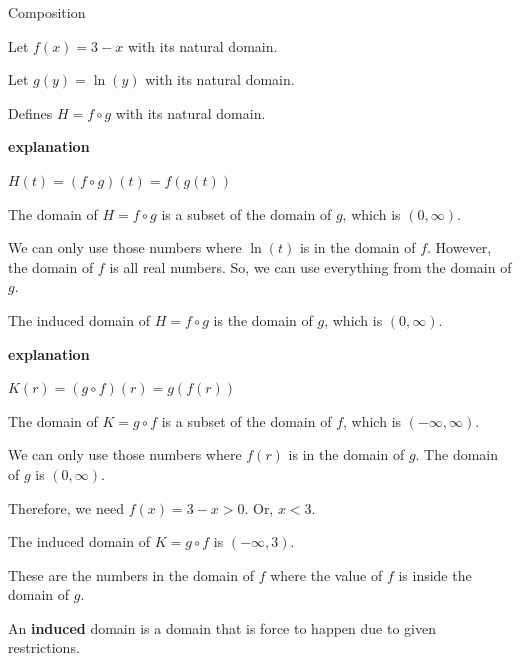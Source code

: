 \documentclass{ximera}
\begin{document}
\begin{example} Composition


Let $f(x) = 3 - x$ with its natural domain.


Let $g(y) = \ln(y)$ with its natural domain.


Defines $H = f \circ g$ with its natural domain.


\textbf{\textcolor{red!75!green}{explanation}} 


$H(t) = (f \circ g)(t) = f(g(t))$


The domain of $H = f \circ g$ is a subset of the domain of $g$, which is $(0, \infty)$.  

We can only use those numbers where $\ln(t)$ is in the domain of $f$.  However, the domain of $f$ is all real numbers.  So, we can use everything from the domain of $g$.

The induced domain of $H = f \circ g$ is the domain of $g$, which is $(0, \infty)$. 











\textbf{\textcolor{red!75!green}{explanation}} 


$K(r) = (g \circ f)(r) = g(f(r))$


The domain of $K = g \circ f$ is a subset of the domain of $f$, which is $(-\infty, \infty)$.  

We can only use those numbers where $f(r)$ is in the domain of $g$.  The domain of $g$ is $(0, \infty)$.  

Therefore, we need $f(x) = 3 - x > 0$.  Or, $x < 3$.

The induced domain of $K = g \circ f$ is $(-\infty, 3)$. 

These are the numbers in the domain of $f$ where the value of $f$ is inside the domain of $g$.







\end{example}


An \textbf{induced} domain is a domain that is force to happen due to given restrictions. 
\end{document}
